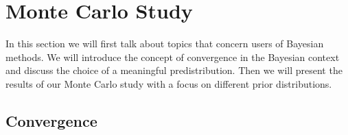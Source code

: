 \setlength{\abovedisplayskip}{2pt}
\setlength{\belowdisplayskip}{2pt}
\section{Monte Carlo Study}
\label{sec:monte_carlo}

In this section we will first talk about topics that concern users of Bayesian methods.  We will introduce the concept of convergence in the Bayesian context and discuss the choice of a meaningful predistribution. Then we will present the results of our Monte Carlo study with a focus on different prior distributions.

\subsection{Convergence}

